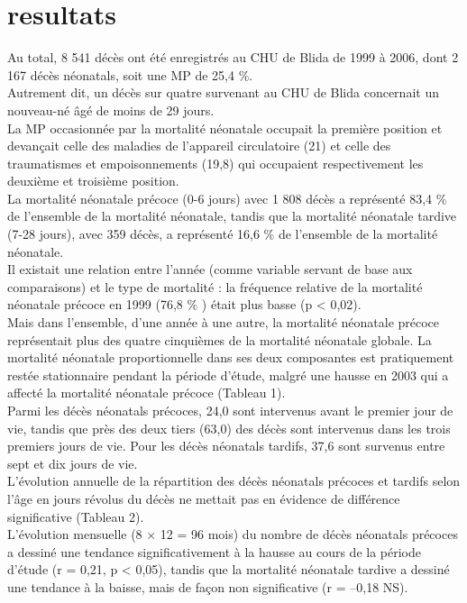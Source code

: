 \section{resultats}
Au total, 8 541 décès ont été enregistrés au CHU de Blida
de 1999 à 2006, dont 2 167 décès néonatals, soit une MP de
25,4 \%.\\
Autrement dit, un décès sur quatre survenant au
CHU de Blida concernait un nouveau-né âgé de moins
de 29 jours. \\ 
La MP occasionnée par la mortalité néonatale
occupait la première position et devançait celle des maladies
de l’appareil circulatoire (21) et celle des traumatismes et
empoisonnements (19,8) qui occupaient respectivement
les deuxième et troisième position. \\

La mortalité néonatale précoce (0-6 jours) avec 1 808
décès a représenté 83,4 \% de l’ensemble de la mortalité
néonatale, tandis que la mortalité néonatale tardive
(7-28 jours), avec 359 décès, a représenté 16,6 \%  de
l’ensemble de la mortalité néonatale.\\ 

Il existait une relation
entre l’année (comme variable servant de base aux
comparaisons) et le type de mortalité : la fréquence relative
de la mortalité néonatale précoce en 1999 (76,8 \% ) était plus
basse (p < 0,02). \\ 

Mais dans l’ensemble, d’une année à une
autre, la mortalité néonatale précoce représentait plus des
quatre cinquièmes de la mortalité néonatale globale.
La mortalité néonatale proportionnelle dans ses deux
composantes est pratiquement restée stationnaire pendant la
période d’étude, malgré une hausse en 2003 qui a affecté la
mortalité néonatale précoce (Tableau 1).\\

Parmi les décès néonatals précoces, 24,0  sont intervenus
avant le premier jour de vie, tandis que près des deux
tiers (63,0) des décès sont intervenus dans les trois
premiers jours de vie. Pour les décès néonatals tardifs,
37,6 sont survenus entre sept et dix jours de vie.\\

L’évolution annuelle de la répartition des décès néonatals
précoces et tardifs selon l’âge en jours révolus du décès
ne mettait pas en évidence de différence significative
(Tableau 2).\\

L’évolution mensuelle (8 × 12 = 96 mois) du nombre de
décès néonatals précoces a dessiné une tendance significativement
à la hausse au cours de la période d’étude (r = 0,21,
p < 0,05), tandis que la mortalité néonatale tardive a dessiné
une tendance à la baisse, mais de façon non significative
(r = –0,18 NS). \\ 

